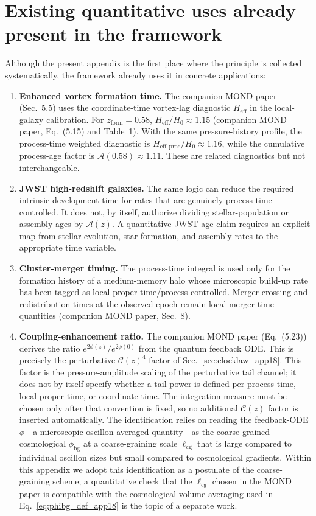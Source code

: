 \documentclass[11pt]{article}
\begin{document}
\section{Existing quantitative uses already present in the framework}
\label{sec:existing_uses_app18}

Although the present appendix is the first place where the principle is
collected systematically, the framework already uses it in concrete
applications:
\begin{enumerate}
\item \textbf{Enhanced vortex formation time.}
  The companion MOND paper (Sec.~5.5) uses the coordinate-time
  vortex-lag diagnostic $H_{\mathrm{eff}}$ in the local-galaxy
  calibration.  For $z_{\mathrm{form}}=0.58$,
  $H_{\mathrm{eff}}/H_0\approx 1.15$ (companion MOND paper,
  Eq.~(5.15) and Table~1).  With the same pressure-history profile,
  the process-time weighted diagnostic is
  $H_{\mathrm{eff,proc}}/H_0\approx 1.16$, while the cumulative
  process-age factor is $\mathcal{A}(0.58)\approx 1.11$.
  These are related diagnostics but not interchangeable.
\item \textbf{JWST high-redshift galaxies.}
  The same logic can reduce the required intrinsic development time
  for rates that are genuinely process-time controlled.  It does not,
  by itself, authorize dividing stellar-population or assembly ages by
  $\mathcal{A}(z)$.  A quantitative JWST age claim requires an explicit
  map from stellar-evolution, star-formation, and assembly rates to the
  appropriate time variable.
\item \textbf{Cluster-merger timing.}
  The process-time integral is used only for the formation history
  of a medium-memory halo whose microscopic build-up rate has been
  tagged as local-proper-time/process-controlled.  Merger crossing
  and redistribution times at the observed epoch remain local
  merger-time quantities (companion MOND paper, Sec.~8).
\item \textbf{Coupling-enhancement ratio.}
  The companion MOND paper (Eq.~(5.23)) derives the ratio
  $e^{2\phi(z)}/e^{2\phi(0)}$ from the quantum feedback ODE.
  This is precisely the perturbative $\mathcal{C}(z)^4$ factor of
  Sec.~\ref{sec:clocklaw_app18}.  This factor is the pressure-amplitude
  scaling of the perturbative tail channel; it does not by itself
  specify whether a tail power is defined per process time, local
  proper time, or coordinate time.  The integration measure must be
  chosen only after that convention is fixed, so no additional
  $\mathcal{C}(z)$ factor is inserted automatically.  The
  identification relies on reading the feedback-ODE $\phi$---a
  microscopic oscillon-averaged quantity---as the coarse-grained
  cosmological $\phi_{\mathrm{bg}}$ at a coarse-graining scale
  $\ell_{\mathrm{cg}}$ that is large compared to individual oscillon
  sizes but small compared to cosmological gradients.  Within this
  appendix we adopt this identification as a postulate of the
  coarse-graining scheme; a quantitative check that the $\ell_{\mathrm{cg}}$
  chosen in the MOND paper is compatible with the cosmological
  volume-averaging used in Eq.~\eqref{eq:phibg_def_app18} is the
  topic of a separate work.
\end{enumerate}
\end{document}
